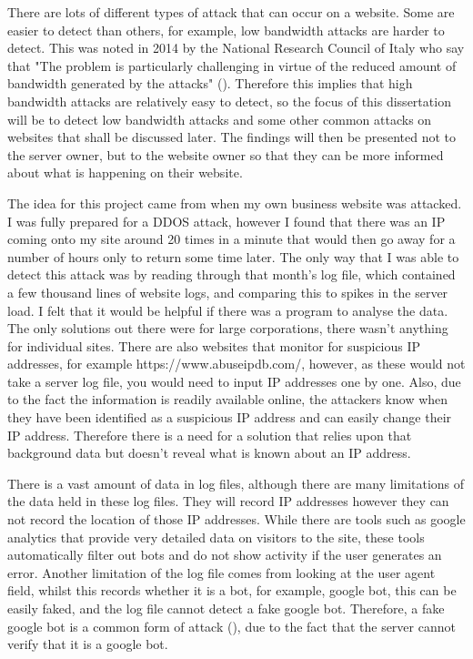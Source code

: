 There are lots of different types of attack that can occur on a website. Some are easier to detect than others, for example, low bandwidth attacks are harder to detect. This was noted in 2014 by the National Research Council of Italy who say that "The problem is particularly challenging in virtue of the reduced amount of bandwidth generated by the attacks" (\cite{aiello2014line}). Therefore this implies that high bandwidth attacks are relatively easy to detect, so the focus of this dissertation will be to detect low bandwidth attacks and some other common attacks on websites that shall be discussed later. The findings will then be presented not to the server owner, but to the website owner so that they can be more informed about what is happening on their website.

The idea for this project came from when my own business website was attacked. I was fully prepared for a DDOS attack, however I found that there was an IP coming onto my site around 20 times in a minute that would then go away for a number of hours only to return some time later. The only way that I was able to detect this attack was by reading through that month's log file, which contained a few thousand lines of website logs, and comparing this to spikes in the server load. I felt that it would be helpful if there was a program to analyse the data. The only solutions out there were for large corporations, there wasn't anything for individual sites. There are also websites that monitor for suspicious IP addresses, for example https://www.abuseipdb.com/, however, as these would not take a server log file, you would need to input IP addresses one by one. Also, due to the fact the information is readily available online, the attackers know when they have been identified as a suspicious IP address and can easily change their IP address. Therefore there is a need for a solution that relies upon that background data but doesn't reveal what is known about an IP address. 

There is a vast amount of data in log files, although there are many limitations of the data held in these log files. They will record IP addresses however they can not record the location of those IP addresses. While there are tools such as google analytics that provide very detailed data on visitors to the site, these tools automatically filter out bots and do not show activity if the user generates an error. Another limitation of the log file comes from looking at the user agent field, whilst this records whether it is a bot, for example, google bot, this can be easily faked, and the log file cannot detect a fake google bot. Therefore, a fake google bot is a common form of attack (\cite{algiryage2018distinguishing}), due to the fact that the server cannot verify that it is a google bot.

